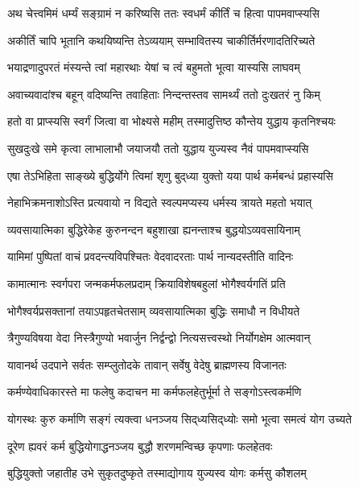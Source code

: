 \twolineshloka
{अथ चेत्त्वमिमं धर्म्यं सङ्ग्रामं न करिष्यसि}
{ततः स्वधर्मं कीर्तिं च हित्वा पापमवाप्स्यसि}%

\twolineshloka
{अकीर्तिं चापि भूतानि कथयिष्यन्ति तेऽव्ययाम्}
{सम्भावितस्य चाकीर्तिर्मरणादतिरिच्यते}%

\twolineshloka
{भयाद्रणादुपरतं मंस्यन्ते त्वां महारथाः}
{येषां च त्वं बहुमतो भूत्वा यास्यसि लाघवम्}%

\twolineshloka
{अवाच्यवादांश्च बहून् वदिष्यन्ति तवाहिताः}
{निन्दन्तस्तव सामर्थ्यं ततो दुःखतरं नु किम्}%

\twolineshloka
{हतो वा प्राप्स्यसि स्वर्गं जित्वा वा भोक्ष्यसे महीम्}
{तस्मादुत्तिष्ठ कौन्तेय युद्धाय कृतनिश्चयः}%

\twolineshloka
{सुखदुःखे समे कृत्वा लाभालाभौ जयाजयौ}
{ततो युद्धाय युज्यस्व नैवं पापमवाप्स्यसि}%

\twolineshloka
{एषा तेऽभिहिता साङ्ख्ये बुद्धिर्योगे त्विमां शृणु}
{बुद्‍ध्या युक्तो यया पार्थ कर्मबन्धं प्रहास्यसि}%

\twolineshloka
{नेहाभिक्रमनाशोऽस्ति प्रत्यवायो न विद्यते}
{स्वल्पमप्यस्य धर्मस्य त्रायते महतो भयात्}%

\twolineshloka
{व्यवसायात्मिका बुद्धिरेकेह कुरुनन्दन}
{बहुशाखा ह्यनन्ताश्च बुद्धयोऽव्यवसायिनाम्}%

\twolineshloka
{यामिमां पुष्पितां वाचं प्रवदन्त्यविपश्चितः}
{वेदवादरताः पार्थ नान्यदस्तीति वादिनः}%

\twolineshloka
{कामात्मानः स्वर्गपरा जन्मकर्मफलप्रदाम्}
{क्रियाविशेषबहुलां भोगैश्वर्यगतिं प्रति}%

\twolineshloka
{भोगैश्वर्यप्रसक्तानां तयाऽपहृतचेतसाम्}
{व्यवसायात्मिका बुद्धिः समाधौ न विधीयते}%

\twolineshloka
{त्रैगुण्यविषया वेदा निस्त्रैगुण्यो भवार्जुन}
{निर्द्वन्द्वो नित्यसत्त्वस्थो निर्योगक्षेम आत्मवान्}%

\twolineshloka
{यावानर्थ उदपाने सर्वतः सम्प्लुतोदके}
{तावान् सर्वेषु वेदेषु ब्राह्मणस्य विजानतः}%

\twolineshloka
{कर्मण्येवाधिकारस्ते मा फलेषु कदाचन}
{मा कर्मफलहेतुर्भूर्मा ते सङ्गोऽस्त्वकर्मणि}%

\twolineshloka
{योगस्थः कुरु कर्माणि सङ्गं त्यक्त्वा धनञ्जय}
{सिद्‌ध्यसिद्‌ध्योः समो भूत्वा समत्वं योग उच्यते}%

\twolineshloka
{दूरेण ह्यवरं कर्म बुद्धियोगाद्धनञ्जय}
{बुद्धौ शरणमन्विच्छ कृपणाः फलहेतवः}%

\twolineshloka
{बुद्धियुक्तो जहातीह उभे सुकृतदुष्कृते}
{तस्माद्योगाय युज्यस्व योगः कर्मसु कौशलम्}%

